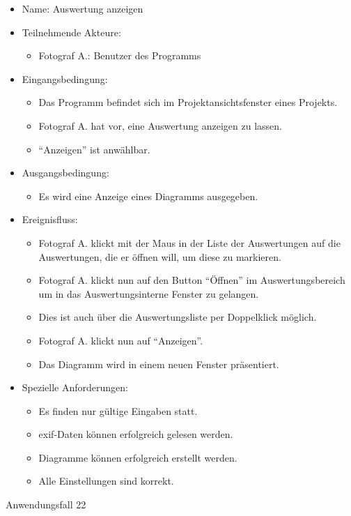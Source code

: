 \begin{itemize}
\begin{itemize}
\item Name: Auswertung anzeigen 
\item Teilnehmende Akteure:
\begin{itemize}
\item Fotograf A.: Benutzer des Programms
\end{itemize}
\item Eingangsbedingung:
\begin{itemize}
\item Das Programm befindet sich im Projektansichtsfenster eines Projekts.
\item Fotograf A. hat vor, eine Auswertung anzeigen zu lassen.
\item "`Anzeigen"' ist anwählbar.
\end{itemize}
\item Ausgangsbedingung:
\begin{itemize}
\item Es wird eine Anzeige eines Diagramms ausgegeben.
\end{itemize}
\item Ereignisfluss:
\begin{itemize}
\item Fotograf A. klickt mit der Maus in der Liste der Auswertungen auf die Auswertungen, die er öffnen will, um diese zu markieren.
\item Fotograf A. klickt nun auf den Button "`Öffnen"' im Auswertungsbereich um in das Auswertungsinterne Fenster zu gelangen.
\item Dies ist auch über die Auswertungsliste per Doppelklick möglich.
\item Fotograf A. klickt nun auf "`Anzeigen"'.
\item Das Diagramm wird in einem neuen Fenster präsentiert.
\end{itemize}
\item Spezielle Anforderungen:
\begin{itemize}
\item Es finden nur gültige Eingaben statt.
\item \gls{exif}-Daten können erfolgreich gelesen werden.
\item Diagramme können erfolgreich erstellt werden.
\item Alle Einstellungen sind korrekt.
\end{itemize}
\end{itemize}
 
\begin{description}
\item[Anwendungsfall 22]
\end{description}
 

\end{itemize}
